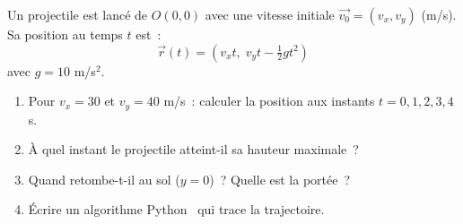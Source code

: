 \begin{challenge}
Un projectile est lanc\'e de $O(0,0)$ avec une vitesse initiale
$\vec{v_0} = (v_x, v_y)$ (m/s). Sa position au temps $t$ est~:
$$\vec{r}(t) = (v_x t,\; v_y t - \tfrac{1}{2}gt^2)$$
avec $g = 10$ m/s$^2$.
\begin{enumerate}
  \item Pour $v_x = 30$ et $v_y = 40$ m/s~:
        calculer la position aux instants $t=0, 1, 2, 3, 4$ s.
  \item \`A quel instant le projectile atteint-il sa hauteur maximale~?
  \item Quand retombe-t-il au sol ($y=0$)~? Quelle est la port\'ee~?
  \item \'Ecrire un algorithme Python \computer\ qui trace la trajectoire.
\end{enumerate}
\end{challenge}

